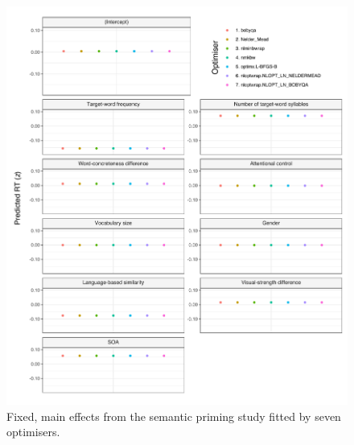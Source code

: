 \documentclass[
  12pt,
  man,floatsintext]{apa7}
\begin{document}
\begin{figure}

{\centering \includegraphics[width=1\linewidth]{../semanticpriming/frequentist_analysis/model_diagnostics/plots/main_effects_semanticpriming_allFit_convergence} 

}

\caption{Fixed, main effects from the semantic priming study fitted by seven optimisers.}\label{fig:main-effects-semanticpriming-allFit-convergence}
\end{figure}
\end{document}
